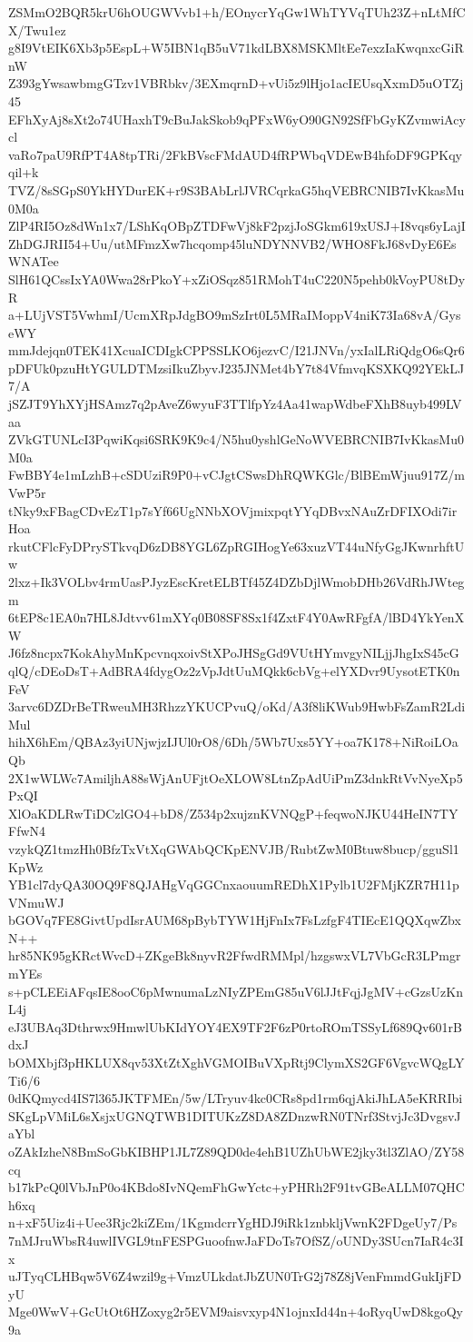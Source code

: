 ZSMmO2BQR5krU6hOUGWVvb1+h/EOnycrYqGw1WhTYVqTUh23Z+nLtMfCX/Twu1ez
g8I9VtEIK6Xb3p5EspL+W5IBN1qB5uV71kdLBX8MSKMltEe7exzIaKwqnxcGiRnW
Z393gYwsawbmgGTzv1VBRbkv/3EXmqrnD+vUi5z9lHjo1acIEUsqXxmD5uOTZj45
EFhXyAj8sXt2o74UHaxhT9cBuJakSkob9qPFxW6yO90GN92SfFbGyKZvmwiAcycl
vaRo7paU9RfPT4A8tpTRi/2FkBVscFMdAUD4fRPWbqVDEwB4hfoDF9GPKqyqil+k
TVZ/8sSGpS0YkHYDurEK+r9S3BAbLrlJVRCqrkaG5hqVEBRCNIB7IvKkasMu0M0a
ZlP4RI5Oz8dWn1x7/LShKqOBpZTDFwVj8kF2pzjJoSGkm619xUSJ+I8vqs6yLajI
ZhDGJRII54+Uu/utMFmzXw7hcqomp45luNDYNNVB2/WHO8FkJ68vDyE6EsWNATee
SlH61QCssIxYA0Wwa28rPkoY+xZiOSqz851RMohT4uC220N5pehb0kVoyPU8tDyR
a+LUjVST5VwhmI/UcmXRpJdgBO9mSzIrt0L5MRaIMoppV4niK73Ia68vA/GyseWY
mmJdejqn0TEK41XcuaICDIgkCPPSSLKO6jezvC/I21JNVn/yxIalLRiQdgO6sQr6
pDFUk0pzuHtYGULDTMzsiIkuZbyvJ235JNMet4bY7t84VfmvqKSXKQ92YEkLJ7/A
jSZJT9YhXYjHSAmz7q2pAveZ6wyuF3TTlfpYz4Aa41wapWdbeFXhB8uyb499LVaa
ZVkGTUNLcI3PqwiKqsi6SRK9K9c4/N5hu0yshlGeNoWVEBRCNIB7IvKkasMu0M0a
FwBBY4e1mLzhB+cSDUziR9P0+vCJgtCSwsDhRQWKGlc/BlBEmWjuu917Z/mVwP5r
tNky9xFBagCDvEzT1p7sYf66UgNNbXOVjmixpqtYYqDBvxNAuZrDFIXOdi7irHoa
rkutCFlcFyDPrySTkvqD6zDB8YGL6ZpRGIHogYe63xuzVT44uNfyGgJKwnrhftUw
2lxz+Ik3VOLbv4rmUasPJyzEscKretELBTf45Z4DZbDjlWmobDHb26VdRhJWtegm
6tEP8c1EA0n7HL8Jdtvv61mXYq0B08SF8Sx1f4ZxtF4Y0AwRFgfA/lBD4YkYenXW
J6fz8ncpx7KokAhyMnKpcvnqxoivStXPoJHSgGd9VUtHYmvgyNILjjJhgIxS45cG
qlQ/cDEoDsT+AdBRA4fdygOz2zVpJdtUuMQkk6cbVg+elYXDvr9UysotETK0nFeV
3arvc6DZDrBeTRweuMH3RhzzYKUCPvuQ/oKd/A3f8liKWub9HwbFsZamR2LdiMul
hihX6hEm/QBAz3yiUNjwjzIJUl0rO8/6Dh/5Wb7Uxs5YY+oa7K178+NiRoiLOaQb
2X1wWLWc7AmiljhA88sWjAnUFjtOeXLOW8LtnZpAdUiPmZ3dnkRtVvNyeXp5PxQI
XlOaKDLRwTiDCzlGO4+bD8/Z534p2xujznKVNQgP+feqwoNJKU44HeIN7TYFfwN4
vzykQZ1tmzHh0BfzTxVtXqGWAbQCKpENVJB/RubtZwM0Btuw8bucp/gguSl1KpWz
YB1cl7dyQA30OQ9F8QJAHgVqGGCnxaouumREDhX1Pylb1U2FMjKZR7H11pVNmuWJ
bGOVq7FE8GivtUpdIsrAUM68pBybTYW1HjFnIx7FsLzfgF4TIEcE1QQXqwZbxN++
hr85NK95gKRctWvcD+ZKgeBk8nyvR2FfwdRMMpl/hzgswxVL7VbGcR3LPmgrmYEs
s+pCLEEiAFqsIE8ooC6pMwnumaLzNIyZPEmG85uV6lJJtFqjJgMV+cGzsUzKnL4j
eJ3UBAq3Dthrwx9HmwlUbKIdYOY4EX9TF2F6zP0rtoROmTSSyLf689Qv601rBdxJ
bOMXbjf3pHKLUX8qv53XtZtXghVGMOIBuVXpRtj9ClymXS2GF6VgvcWQgLYTi6/6
0dKQmycd4IS7l365JKTFMEn/5w/LTryuv4kc0CRs8pd1rm6qjAkiJhLA5eKRRIbi
SKgLpVMiL6sXsjxUGNQTWB1DITUKzZ8DA8ZDnzwRN0TNrf3StvjJc3DvgsvJaYbl
oZAkIzheN8BmSoGbKIBHP1JL7Z89QD0de4ehB1UZhUbWE2jky3tl3ZlAO/ZY58cq
b17kPcQ0lVbJnP0o4KBdo8IvNQemFhGwYctc+yPHRh2F91tvGBeALLM07QHCh6xq
n+xF5Uiz4i+Uee3Rjc2kiZEm/1KgmdcrrYgHDJ9iRk1znbkljVwnK2FDgeUy7/Ps
7nMJruWbsR4uwlIVGL9tnFESPGuoofnwJaFDoTs7OfSZ/oUNDy3SUcn7IaR4c3Ix
uJTyqCLHBqw5V6Z4wzil9g+VmzULkdatJbZUN0TrG2j78Z8jVenFmmdGukIjFDyU
Mge0WwV+GcUtOt6HZoxyg2r5EVM9aisvxyp4N1ojnxId44n+4oRyqUwD8kgoQy9a
